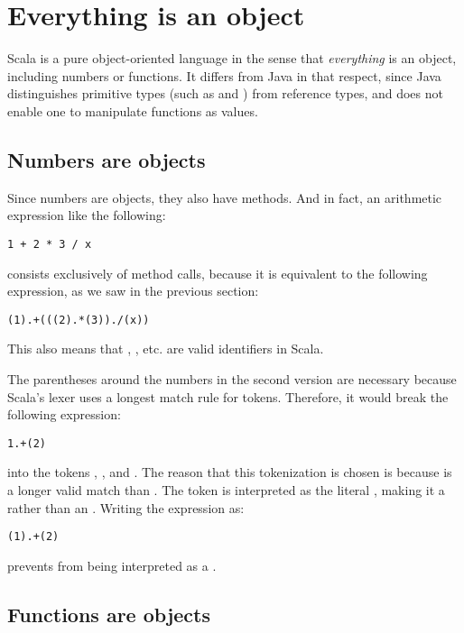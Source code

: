 \documentclass[a4paper,12pt,twoside,titlepage]{article}
\newcommand{\langname}[1]{#1\xspace}
\newcommand{\Scala}{\langname{Scala}}
\newcommand{\Java}{\langname{Java}}
\begin{document}
\section{Everything is an object}
\label{sec:everything-an-object}

\Scala is a pure object-oriented language in the sense that
\emph{everything} is an object, including numbers or functions. It
differs from \Java in that respect, since \Java distinguishes
primitive types (such as  and ) from reference
types, and does not enable one to manipulate functions as values.

\subsection{Numbers are objects}
\label{sec:numbers-are-objects}

Since numbers are objects, they also have methods. And in fact, an
arithmetic expression like the following:
\begin{lstlisting}
1 + 2 * 3 / x
\end{lstlisting}
consists exclusively of method calls, because it is equivalent to the
following expression, as we saw in the previous section:
\begin{lstlisting}
(1).+(((2).*(3))./(x))
\end{lstlisting}
This also means that \code{+}, \code{*}, etc. are valid identifiers
in \Scala.  

The parentheses around the numbers in the second version are necessary
because Scala's lexer uses a longest match rule for tokens.
Therefore, it would break the following expression:
\begin{lstlisting}
1.+(2)
\end{lstlisting}
into the tokens , \code{+}, and .  The reason that
this tokenization is chosen is because  is a longer valid
match than .  The token  is interpreted as the
literal , making it a  rather than an
.  Writing the expression as:
\begin{lstlisting}
(1).+(2)
\end{lstlisting}
prevents  from being interpreted as a .

\subsection{Functions are objects}
\label{sec:funct-are-objects}
\end{document}
